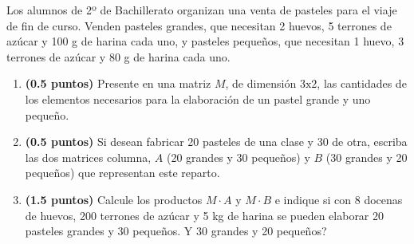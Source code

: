 
Los alumnos de 2º de Bachillerato organizan una venta de pasteles para el viaje de fin de curso. Venden pasteles grandes, que necesitan 2 huevos, 5 terrones de azúcar y 100 g de harina cada uno, y pasteles pequeños, que necesitan 1 huevo, 3 terrones de azúcar y 80 g de harina cada uno.
\begin{enumerate}[label=\alph*)]
\item \textbf{(0.5 puntos)} Presente en una matriz $M$, de dimensión $3\mathrm{x}2$, las cantidades de los elementos necesarios para la elaboración de un pastel grande y uno pequeño.
\item \textbf{(0.5 puntos)} Si desean fabricar 20 pasteles de una clase y 30 de otra, escriba las dos matrices columna, $A$ (20 grandes y 30 pequeños) y $B$ (30 grandes y 20 pequeños) que representan este reparto.
\item \textbf{(1.5 puntos)} Calcule los productos $M\cdot A$ y $M\cdot B$ e indique si con 8 docenas de huevos, 200 terrones de azúcar y 5 kg de harina se pueden elaborar 20 pasteles grandes y 30 pequeños. \textquestiondown{}Y 30 grandes y 20 pequeños?
\end{enumerate}
